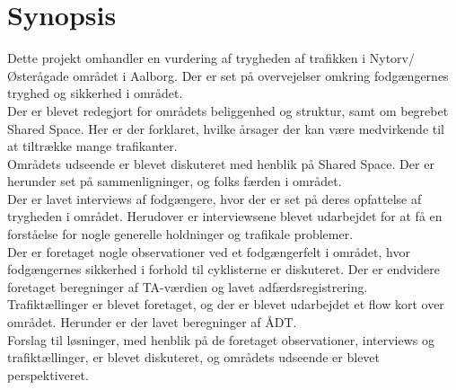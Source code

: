 \section{Synopsis}
\label{sec:synopsis}





{\tiny Dette projekt omhandler en vurdering af trygheden af trafikken i Nytorv/Østerågade området i Aalborg. Der er set på overvejelser omkring fodgængernes tryghed og sikkerhed i området.
\\
Der er blevet redegjort for områdets beliggenhed og struktur, samt om begrebet Shared Space. Her er der forklaret, hvilke årsager der kan være medvirkende til at tiltrække mange trafikanter.
\\
Områdets udseende er blevet diskuteret med henblik på Shared Space. Der er herunder set på sammenligninger, og folks færden i området.
\\
Der er lavet interviews af fodgængere, hvor der er set på deres opfattelse af trygheden i området. Herudover er interviewsene blevet udarbejdet for at få en forståelse for nogle generelle holdninger og trafikale problemer.
\\
Der er foretaget nogle observationer ved et fodgængerfelt i området, hvor fodgængernes sikkerhed i forhold til cyklisterne er diskuteret. Der er endvidere foretaget beregninger af TA-værdien og lavet adfærdsregistrering.
\\
Trafiktællinger er blevet foretaget, og der er blevet udarbejdet et flow kort over området. Herunder er der lavet beregninger af ÅDT.
\\
Forslag til løsninger, med henblik på de foretaget observationer, interviews og trafiktællinger, er blevet diskuteret, og områdets udseende er blevet perspektiveret.}
